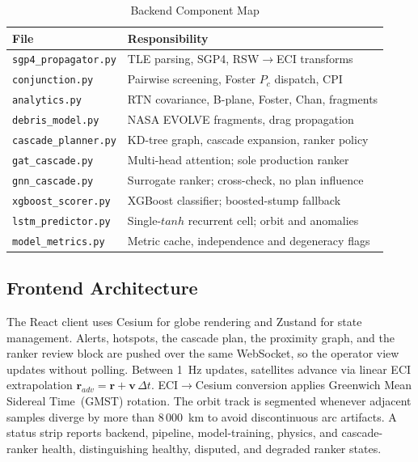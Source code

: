 \documentclass[conference]{IEEEtran}
\newcommand{\bvec}[1]{\mathbf{#1}}
\newcommand{\Pc}{P_c}
\begin{document}
\begin{table}[h]
\caption{Backend Component Map}
\label{tab:components}
\centering
\footnotesize
\begin{tabular}{@{}p{2.9cm}p{4.9cm}@{}}
\toprule
\textbf{File} & \textbf{Responsibility} \\
\midrule
\texttt{sgp4\_propagator.py}  & TLE parsing, SGP4, RSW$\to$ECI transforms \\
\texttt{conjunction.py}       & Pairwise screening, Foster $\Pc$ dispatch, CPI \\
\texttt{analytics.py}         & RTN covariance, B-plane, Foster, Chan, fragments \\
\texttt{debris\_model.py}     & NASA EVOLVE fragments, drag propagation \\
\texttt{cascade\_planner.py}  & KD-tree graph, cascade expansion, ranker policy \\
\texttt{gat\_cascade.py}      & Multi-head attention; sole production ranker \\
\texttt{gnn\_cascade.py}      & Surrogate ranker; cross-check, no plan influence \\
\texttt{xgboost\_scorer.py}   & XGBoost classifier; boosted-stump fallback \\
\texttt{lstm\_predictor.py}   & Single-$tanh$ recurrent cell; orbit and anomalies \\
\texttt{model\_metrics.py}    & Metric cache, independence and degeneracy flags \\
\bottomrule
\end{tabular}
\end{table}

\subsection{Frontend Architecture}

The React client uses Cesium for globe rendering and Zustand for state management.
Alerts, hotspots, the cascade plan, the proximity graph, and the ranker review
block are pushed over the same WebSocket, so the operator view updates without
polling. Between 1~Hz updates, satellites advance via linear ECI extrapolation
$\bvec{r}_{adv} = \bvec{r} + \bvec{v}\,\Delta t$. ECI$\to$Cesium conversion
applies Greenwich Mean Sidereal Time~(GMST) rotation. The orbit track is
segmented whenever adjacent samples diverge by more than 8\,000~km to avoid
discontinuous arc artifacts. A status strip reports backend, pipeline,
model-training, physics, and cascade-ranker health, distinguishing healthy,
disputed, and degraded ranker states.
\end{document}
